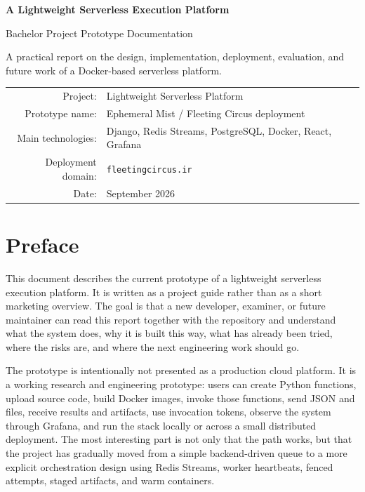 \documentclass[12pt,a4paper]{report}
\begin{document}
\begin{titlepage}
  \centering
  \vspace*{2cm}
  {\Huge\bfseries A Lightweight Serverless Execution Platform\par}
  \vspace{0.6cm}
  {\Large Bachelor Project Prototype Documentation\par}
  \vspace{1.5cm}
  {\large A practical report on the design, implementation, deployment, evaluation, and future work of a Docker-based serverless platform.\par}
  \vfill
  \begin{tabular}{rl}
    Project: & Lightweight Serverless Platform \\
    Prototype name: & Ephemeral Mist / Fleeting Circus deployment \\
    Main technologies: & Django, Redis Streams, PostgreSQL, Docker, React, Grafana \\
    Deployment domain: & \texttt{fleetingcircus.ir} \\
    Date: & September 2026
  \end{tabular}
  \vfill
\end{titlepage}

\tableofcontents
\clearpage
{}

\chapter*{Preface}

This document describes the current prototype of a lightweight serverless
execution platform. It is written as a project guide rather than as a short
marketing overview. The goal is that a new developer, examiner, or future
maintainer can read this report together with the repository and understand
what the system does, why it is built this way, what has already been tried,
where the risks are, and where the next engineering work should go.

The prototype is intentionally not presented as a production cloud platform.
It is a working research and engineering prototype: users can create Python
functions, upload source code, build Docker images, invoke those functions,
send JSON and files, receive results and artifacts, use invocation tokens,
observe the system through Grafana, and run the stack locally or across a small
distributed deployment. The most interesting part is not only that the path
works, but that the project has gradually moved from a simple backend-driven
queue to a more explicit orchestration design using Redis Streams, worker
heartbeats, fenced attempts, staged artifacts, and warm containers.
\end{document}
